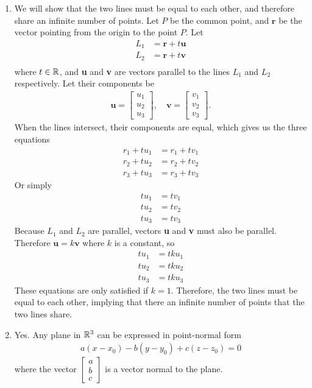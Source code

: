 \item
\begin{enumerate}
\item We will show that the two lines must be equal to each other, and therefore share an infinite number of points. Let $P$ be the common point, and $\mathbf{r}$ be the vector pointing from the origin to the point $P$. Let 
\begin{align*}
  L_1 &= \mathbf{r} + t\mathbf{u} \\
  L_2 &= \mathbf{r} + t\mathbf{v} \\  
\end{align*}
where $t \in \mathbb{R}$, and \textbf{u} and \textbf{v} are vectors parallel to the lines $L_1$ and $L_2$ respectively. Let their components be 
\begin{align*}
\mathbf{u} = \begin{bmatrix} u_1 \\ u_2 \\ u_3 \end{bmatrix},  \quad
\mathbf{v} = \begin{bmatrix} v_1 \\ v_2 \\ v_3 \end{bmatrix} .
\end{align*}
When the lines intersect, their components are equal, which gives us the three equations 
\begin{align*}
r_1 +t u_1 &= r_1 + tv_1 \\
r_2 +t u_2 &= r_2 + tv_2 \\
r_3 +t u_3 &= r_3 + tv_3 
\end{align*}
Or simply
\begin{align*}
t u_1 &= tv_1 \\
t u_2 &= tv_2 \\
t u_3 &= tv_3 
\end{align*}
Because $L_1$ and $L_2$ are parallel, vectors \textbf{u} and \textbf{v} must also be parallel. Therefore $\mathbf{u}=k\mathbf{v}$ where $k$ is a constant, so 
\begin{align*}
t u_1 &= tku_1 \\
t u_2 &= tku_2 \\
t u_3 &= tku_3 
\end{align*}
These equations are only satisfied if $k=1$. Therefore, the two lines must be equal to each other, implying that there an infinite number of points that the two lines share. 
\item Yes. Any plane in $\mathbb{R}^3$ can be expressed in point-normal form 
\begin{align*}
a(x-x_0) - b(y-y_0)+c(z-z_0) = 0
\end{align*}
where the vector $\begin{bmatrix} a \\ b \\ c \end{bmatrix}$ is a vector normal to the plane. 
\end{enumerate}

